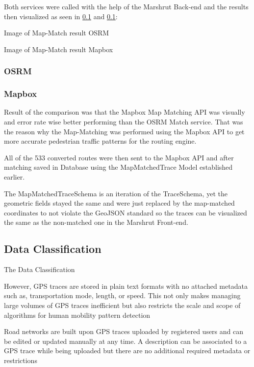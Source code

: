 Both services were called with the help of the Marshrut Back-end and the results then visualized as seen in \ref{} and \ref{}:  

Image of Map-Match result OSRM

Image of Map-Match result Mapbox

\subsubsection{OSRM}

\subsubsection{Mapbox}

Result of the comparison was that the Mapbox Map Matching API was visually and error rate wise better performing than the OSRM Match service. That was the reason why the Map-Matching was performed using the Mapbox API to get more accurate pedestrian traffic patterns for the routing engine. 

All of the 533 converted routes were then sent to the Mapbox API and after matching saved in Database using the MapMatchedTrace Model established earlier. 

The MapMatchedTraceSchema is an iteration of the TraceSchema, yet the geometric fields stayed the same and were just replaced by the map-matched coordinates to not violate the GeoJSON standard so the traces can be visualized the same as the non-matched one in the Marshrut Front-end.


\autocite[]{Delling2012}

\subsection{Data Classification}

The Data Classification

However, GPS traces are stored in plain text formats with no attached metadata such as, transportation mode, length, or speed. This not only makes managing large volumes of GPS traces inefficient but also restricts the scale and scope of algorithms for human mobility pattern detection

Road networks are built upon GPS traces uploaded by registered users and can be edited or updated manually at any time. A description can be associated to a GPS trace while being uploaded but there are no additional required metadata or restrictions

